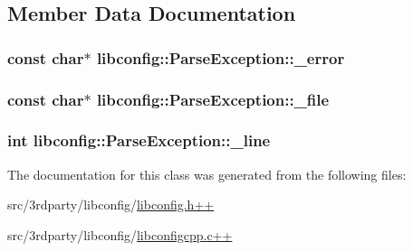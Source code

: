 \subsection{Member Data Documentation}
\hypertarget{classlibconfig_1_1ParseException_a4611bdffd67b8c4934bf43b7802bdc73}{
\subsubsection[{\-\_\-error}]{\setlength{\rightskip}{0pt plus 5cm}const char$\ast$ libconfig\-::\-Parse\-Exception\-::\-\_\-error\hspace{0.3cm}{\ttfamily [private]}}}\label{classlibconfig_1_1ParseException_a4611bdffd67b8c4934bf43b7802bdc73}
\hypertarget{classlibconfig_1_1ParseException_aa9b51ef81102559a811ae7371b38617f}{
\subsubsection[{\-\_\-file}]{\setlength{\rightskip}{0pt plus 5cm}const char$\ast$ libconfig\-::\-Parse\-Exception\-::\-\_\-file\hspace{0.3cm}{\ttfamily [private]}}}\label{classlibconfig_1_1ParseException_aa9b51ef81102559a811ae7371b38617f}
\hypertarget{classlibconfig_1_1ParseException_a4e478e6b2177c927c71f40387e5ed867}{
\subsubsection[{\-\_\-line}]{\setlength{\rightskip}{0pt plus 5cm}int libconfig\-::\-Parse\-Exception\-::\-\_\-line\hspace{0.3cm}{\ttfamily [private]}}}\label{classlibconfig_1_1ParseException_a4e478e6b2177c927c71f40387e5ed867}


The documentation for this class was generated from the following files\-:\begin{DoxyCompactItemize}
\item 
src/3rdparty/libconfig/\hyperlink{libconfig_8h_09_09}{libconfig.\-h++}\item 
src/3rdparty/libconfig/\hyperlink{libconfigcpp_8c_09_09}{libconfigcpp.\-c++}\end{DoxyCompactItemize}
